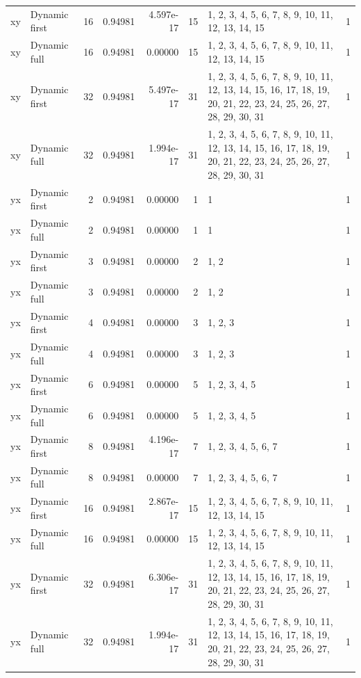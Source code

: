 \documentclass[10pt,a4paper]{article}
\begin{document}
\begin{longtable}{@{}p{23mm}p{29mm}rrrrp{36mm}r@{}}
xy & Dynamic first & 16 & 0.94981 & 4.597e-17 & 15 & 1, 2, 3, 4, 5, 6, 7, 8, 9, 10, 11, 12, 13, 14, 15 & 1 \\
xy & Dynamic full & 16 & 0.94981 & 0.00000 & 15 & 1, 2, 3, 4, 5, 6, 7, 8, 9, 10, 11, 12, 13, 14, 15 & 1 \\
xy & Dynamic first & 32 & 0.94981 & 5.497e-17 & 31 & 1, 2, 3, 4, 5, 6, 7, 8, 9, 10, 11, 12, 13, 14, 15, 16, 17, 18, 19, 20, 21, 22, 23, 24, 25, 26, 27, 28, 29, 30, 31 & 1 \\
xy & Dynamic full & 32 & 0.94981 & 1.994e-17 & 31 & 1, 2, 3, 4, 5, 6, 7, 8, 9, 10, 11, 12, 13, 14, 15, 16, 17, 18, 19, 20, 21, 22, 23, 24, 25, 26, 27, 28, 29, 30, 31 & 1 \\
yx & Dynamic first & 2 & 0.94981 & 0.00000 & 1 & 1 & 1 \\
yx & Dynamic full & 2 & 0.94981 & 0.00000 & 1 & 1 & 1 \\
yx & Dynamic first & 3 & 0.94981 & 0.00000 & 2 & 1, 2 & 1 \\
yx & Dynamic full & 3 & 0.94981 & 0.00000 & 2 & 1, 2 & 1 \\
yx & Dynamic first & 4 & 0.94981 & 0.00000 & 3 & 1, 2, 3 & 1 \\
yx & Dynamic full & 4 & 0.94981 & 0.00000 & 3 & 1, 2, 3 & 1 \\
yx & Dynamic first & 6 & 0.94981 & 0.00000 & 5 & 1, 2, 3, 4, 5 & 1 \\
yx & Dynamic full & 6 & 0.94981 & 0.00000 & 5 & 1, 2, 3, 4, 5 & 1 \\
yx & Dynamic first & 8 & 0.94981 & 4.196e-17 & 7 & 1, 2, 3, 4, 5, 6, 7 & 1 \\
yx & Dynamic full & 8 & 0.94981 & 0.00000 & 7 & 1, 2, 3, 4, 5, 6, 7 & 1 \\
yx & Dynamic first & 16 & 0.94981 & 2.867e-17 & 15 & 1, 2, 3, 4, 5, 6, 7, 8, 9, 10, 11, 12, 13, 14, 15 & 1 \\
yx & Dynamic full & 16 & 0.94981 & 0.00000 & 15 & 1, 2, 3, 4, 5, 6, 7, 8, 9, 10, 11, 12, 13, 14, 15 & 1 \\
yx & Dynamic first & 32 & 0.94981 & 6.306e-17 & 31 & 1, 2, 3, 4, 5, 6, 7, 8, 9, 10, 11, 12, 13, 14, 15, 16, 17, 18, 19, 20, 21, 22, 23, 24, 25, 26, 27, 28, 29, 30, 31 & 1 \\
yx & Dynamic full & 32 & 0.94981 & 1.994e-17 & 31 & 1, 2, 3, 4, 5, 6, 7, 8, 9, 10, 11, 12, 13, 14, 15, 16, 17, 18, 19, 20, 21, 22, 23, 24, 25, 26, 27, 28, 29, 30, 31 & 1 \\
\end{longtable}\normalsize\setlength{\tabcolsep}{6pt}
\clearpage
\end{document}
